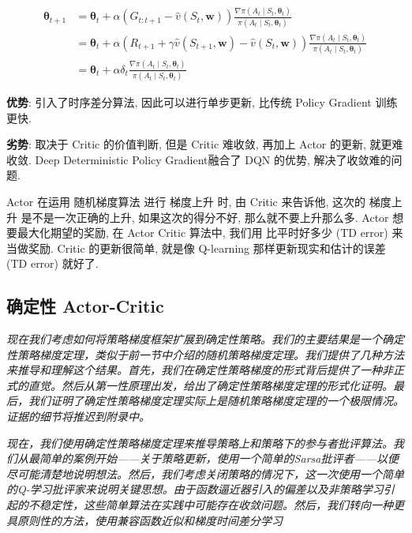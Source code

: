 \documentclass{article}
\begin{document}
        \begin{align*}
            \boldsymbol{\theta}_{t+1} 
            &= \boldsymbol{\theta}_{t}+\alpha\left(G_{t: t+1}-\hat{v}\left(S_{t}, \mathbf{w}\right)\right) \frac{\nabla \pi\left(A_{t} \mid S_{t}, \boldsymbol{\theta}_{t}\right)}{\pi\left(A_{t} \mid S_{t}, \boldsymbol{\theta}_{t}\right)} \\
            &=\boldsymbol{\theta}_{t}+\alpha\left(R_{t+1}+\gamma \hat{v}\left(S_{t+1}, \mathbf{w}\right)-\hat{v}\left(S_{t}, \mathbf{w}\right)\right) \frac{\nabla \pi\left(A_{t} \mid S_{t}, \boldsymbol{\theta}_{t}\right)}{\pi\left(A_{t} \mid S_{t}, \boldsymbol{\theta}_{t}\right)} \\
            &=\boldsymbol{\theta}_{t}+\alpha \delta_{t} \frac{\nabla \pi\left(A_{t} \mid S_{t}, \boldsymbol{\theta}_{t}\right)}{\pi\left(A_{t} \mid S_{t}, \boldsymbol{\theta}_{t}\right)}
        \end{align*}
        
        \textbf{优势}: 引入了时序差分算法, 因此可以进行单步更新, 比传统 Policy Gradient 训练更快.
        
        \textbf{劣势}: 取决于 Critic 的价值判断, 但是 Critic 难收敛, 再加上 Actor 的更新, 就更难收敛. Deep Deterministic Policy Gradient融合了 DQN 的优势, 解决了收敛难的问题.  
        
        Actor 在运用 随机梯度算法 进行 梯度上升 时, 由 Critic 来告诉他, 这次的 梯度上升 是不是一次正确的上升, 如果这次的得分不好, 那么就不要上升那么多. Actor 想要最大化期望的奖励, 在 Actor Critic 算法中, 我们用 比平时好多少 (TD error) 来当做奖励. Critic 的更新很简单, 就是像 Q-learning 那样更新现实和估计的误差 (TD error) 就好了.
        
    \subsection{确定性 Actor-Critic}
        \textit{现在我们考虑如何将策略梯度框架扩展到确定性策略。我们的主要结果是一个确定性策略梯度定理，类似于前一节中介绍的随机策略梯度定理。我们提供了几种方法来推导和理解这个结果。首先，我们在确定性策略梯度的形式背后提供了一种非正式的直觉。然后从第一性原理出发，给出了确定性策略梯度定理的形式化证明。最后，我们证明了确定性策略梯度定理实际上是随机策略梯度定理的一个极限情况。证据的细节将推迟到附录中。}
    
    
        \textit{现在，我们使用确定性策略梯度定理来推导策略上和策略下的参与者批评算法。我们从最简单的案例开始——关于策略更新，使用一个简单的Sarsa批评者——以便尽可能清楚地说明想法。然后，我们考虑关闭策略的情况下，这一次使用一个简单的Q-学习批评家来说明关键思想。由于函数逼近器引入的偏差以及非策略学习引起的不稳定性，这些简单算法在实践中可能存在收敛问题。然后，我们转向一种更具原则性的方法，使用兼容函数近似和梯度时间差分学习}
        
\end{document}

